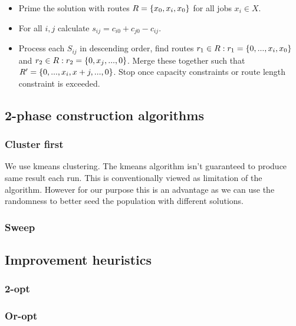 \begin{itemize}
	\item Prime the solution with routes $R = \{x_0, x_i, x_0\}$ for all jobs $x_i \in X$.
	\item For all $i,j$ calculate $s_{ij} = c_{i0} + c_{j0} - c_{ij}$.
	\item Process each $S_{ij}$ in descending order, find routes $r_1 \in R : r_1 = \{0,...,x_i,x_0\}$ and $r_2 \in R: r_2 = \{0,x_j,...,0\}$. Merge these together such that $R' = \{0,...,x_i, x+j,...,0\}$. Stop once capacity constraints or route length constraint is exceeded.
\end{itemize}



\subsection{2-phase construction algorithms}
\label{2phasealgorithms}

\subsubsection{Cluster first}

We use kmeans clustering. The kmeans algorithm isn't guaranteed to produce same result each run. This is conventionally viewed as limitation of the algorithm. However for our purpose this is an advantage as we can use the randomness to better seed the population with different solutions.  

\subsubsection{Sweep}


\subsection{Improvement heuristics}

\subsubsection{2-opt}

\subsubsection{Or-opt}

